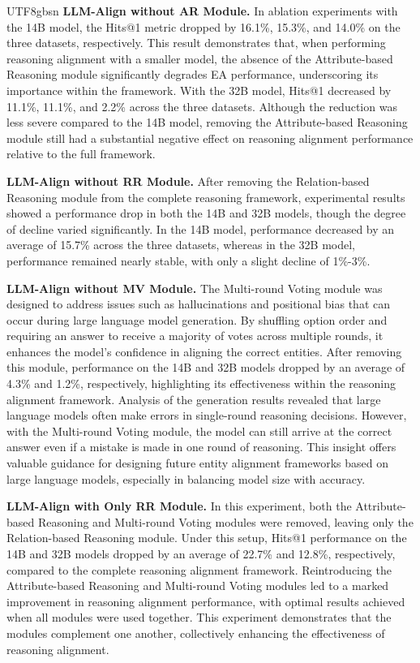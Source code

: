 \documentclass[preprint,12pt]{elsarticle}
\begin{document}
\begin{CJK}{UTF8}{gbsn}
\textbf{LLM-Align without AR Module.} In ablation experiments with the 14B model, the Hits@1 metric dropped by 16.1\%, 15.3\%, and 14.0\% on the three datasets, respectively. This result demonstrates that, when performing reasoning alignment with a smaller model, the absence of the Attribute-based Reasoning module significantly degrades EA performance, underscoring its importance within the framework. With the 32B model, Hits@1 decreased by 11.1\%, 11.1\%, and 2.2\% across the three datasets. Although the reduction was less severe compared to the 14B model, removing the Attribute-based Reasoning module still had a substantial negative effect on reasoning alignment performance relative to the full framework.

\textbf{LLM-Align without RR Module.} After removing the Relation-based Reasoning module from the complete reasoning framework, experimental results showed a performance drop in both the 14B and 32B models, though the degree of decline varied significantly. In the 14B model, performance decreased by an average of 15.7\% across the three datasets, whereas in the 32B model, performance remained nearly stable, with only a slight decline of 1\%-3\%.

\textbf{LLM-Align without MV Module.} The Multi-round Voting module was designed to address issues such as hallucinations and positional bias that can occur during large language model generation. By shuffling option order and requiring an answer to receive a majority of votes across multiple rounds, it enhances the model’s confidence in aligning the correct entities. After removing this module, performance on the 14B and 32B models dropped by an average of 4.3\% and 1.2\%, respectively, highlighting its effectiveness within the reasoning alignment framework. Analysis of the generation results revealed that large language models often make errors in single-round reasoning decisions. However, with the Multi-round Voting module, the model can still arrive at the correct answer even if a mistake is made in one round of reasoning. This insight offers valuable guidance for designing future entity alignment frameworks based on large language models, especially in balancing model size with accuracy.

\textbf{LLM-Align with Only RR Module.} In this experiment, both the Attribute-based Reasoning and Multi-round Voting modules were removed, leaving only the Relation-based Reasoning module. Under this setup, Hits@1 performance on the 14B and 32B models dropped by an average of 22.7\% and 12.8\%, respectively, compared to the complete reasoning alignment framework. Reintroducing the Attribute-based Reasoning and Multi-round Voting modules led to a marked improvement in reasoning alignment performance, with optimal results achieved when all modules were used together. This experiment demonstrates that the modules complement one another, collectively enhancing the effectiveness of reasoning alignment.


\end{CJK}
\end{document}
